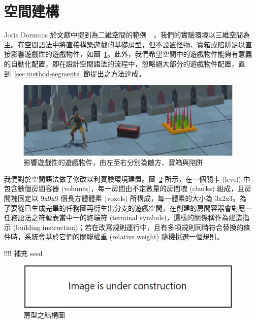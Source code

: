 \clearpage

\section{空間建構}
\label{sec:method-spacepieces}

Joris Dormans 於文獻中提到為二維空間的範例~\cite{dormans2010adventures}~\cite{dormans2012engineering}，我們的實驗環境以三維空間為主。在空間語法中將直接構築遊戲的基礎房型，但不設置怪物、寶箱或陷阱足以直接影響遊戲性的遊戲物件，如圖~\ref{fig:gameobject-list}。此外，我們希望空間中的遊戲物件能夠有意義的自動化配置，即在設計空間語法的流程中，忽略絕大部分的遊戲物件配置，直到~\ref{sec:method-segments} 節提出之方法達成。

\begin{figure}[ht]
  \begin{center}
    \includegraphics[width=1.0\textwidth]{figures/gameobject-list.png}
    \caption{影響遊戲性的遊戲物件，由左至右分別為敵方、寶箱與陷阱} 
    \label{fig:gameobject-list}
  \end{center}
\end{figure}

我們對於空間語法做了修改以利實驗環境建置。圖~\ref{fig:spacepieces-structure} 所示，在一個關卡 (level) 中包含數個房間容器 (volumes)，每一房間由不定數量的房間塊 (chucks) 組成，且房間塊固定以 9x9x9 個長方體體素 (voxels) 所構成，每一體素的大小為 3x2x3。為了要從已生成完畢的任務圖再衍生出分支的遊戲空間，在創建的房間容器會對應一任務語法之符號表當中一的終端符 (terminal symbols)，這樣的關係稱作為建造指示 (building instruction)；若在改寫規則運行中，且有多項規則同時符合替換的條件時，系統會基於它們的關聯權重 (relative weight) 隨機挑選一個規則。

!!!! 補充 seed

\begin{figure}[ht]
  \begin{center}
    \includegraphics[width=1.0\textwidth]{figures/under_construction.png}
    \caption{房型之結構圖} 
    \label{fig:spacepieces-structure}
  \end{center}
\end{figure}

